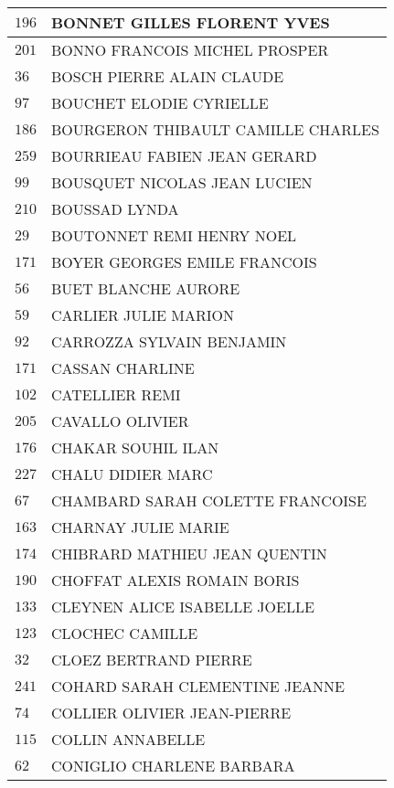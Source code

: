 \begin{xltabular}{\linewidth}{|l|X|}
    \hline
    $196$ & BONNET GILLES FLORENT YVES \\
    \hline
    $201$ & BONNO FRANCOIS MICHEL PROSPER \\
    \hline
    $36$ & BOSCH PIERRE ALAIN CLAUDE \\
    \hline
    $97$ & BOUCHET ELODIE CYRIELLE \\
    \hline
    $186$ & BOURGERON THIBAULT CAMILLE CHARLES \\
    \hline
    $259$ & BOURRIEAU FABIEN JEAN GERARD \\
    \hline
    $99$ & BOUSQUET NICOLAS JEAN LUCIEN \\
    \hline
    $210$ & BOUSSAD LYNDA \\
    \hline
    $29$ & BOUTONNET REMI HENRY NOEL \\
    \hline
    $171$ & BOYER GEORGES EMILE FRANCOIS \\
    \hline
    $56$ & BUET BLANCHE AURORE \\
    \hline
    $59$ & CARLIER JULIE MARION \\
    \hline
    $92$ & CARROZZA SYLVAIN BENJAMIN \\
    \hline
    $171$ & CASSAN CHARLINE \\
    \hline
    $102$ & CATELLIER REMI \\
    \hline
    $205$ & CAVALLO OLIVIER \\
    \hline
    $176$ & CHAKAR SOUHIL ILAN \\
    \hline
    $227$ & CHALU DIDIER MARC \\
    \hline
    $67$ & CHAMBARD SARAH COLETTE FRANCOISE \\
    \hline
    $163$ & CHARNAY JULIE MARIE \\
    \hline
    $174$ & CHIBRARD MATHIEU JEAN QUENTIN \\
    \hline
    $190$ & CHOFFAT ALEXIS ROMAIN BORIS \\
    \hline
    $133$ & CLEYNEN ALICE ISABELLE JOELLE \\
    \hline
    $123$ & CLOCHEC CAMILLE \\
    \hline
    $32$ & CLOEZ BERTRAND PIERRE \\
    \hline
    $241$ & COHARD SARAH CLEMENTINE JEANNE \\
    \hline
    $74$ & COLLIER OLIVIER JEAN-PIERRE \\
    \hline
    $115$ & COLLIN ANNABELLE \\
    \hline
    $62$ & CONIGLIO CHARLENE BARBARA \\

\end{xltabular}
